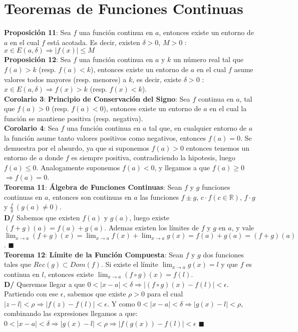 \documentclass[11pt,a4paper]{article}
\newcommand*{\QEDA}{\null\nobreak\hfill\ensuremath{\blacksquare}}
\begin{document}
\section{Teoremas de Funciones Continuas}
\textbf{Proposici\'on 11}: Sea $f$ una funci\'on continua en $a$, entonces existe un entorno de $a$ en el cual $f$ est\'a acotada. Es decir, existen $\delta > 0$, $M > 0$ : $x \in E(a, \delta) \Rightarrow |f(x)| \leq M$\\

\noindent \textbf{Proposici\'on 12}: Sea $f$ una funci\'on continua en $a$ y $k$ un n\'umero real tal que $f(a) > k$ (resp. $f(a) < k$), entonces existe un entorno de $a$ en el cual $f$ asume valores todos mayores (resp. menores) a $k$, es decir, existe $\delta > 0$ : $x \in E(a,\delta) \Rightarrow f(x) > k$ (resp. $f(x) < k$).\\

\noindent \textbf{Corolario 3}: \textbf{Principio de Conservaci\'on del Signo}: Sea $f$ continua en $a$, tal que $f(a)>0$ (resp. $f(a)<0$), entonces existe un entorno de $a$ en el cual la funci\'on se mantiene positiva (resp. negativa).\\

\noindent \textbf{Corolario 4}: Sea $f$ una funci\'on continua en $a$ tal que, en cualquier entorno de $a$ la funci\'on asume tanto valores positivos como negativos, entonces $f(a)=0$. Se demuestra por el absurdo, ya que si suponemos $f(a)>0$ entonces tenemos un entorno de $a$ donde $f$ es siempre positiva, contradiciendo la hipotesis, luego $f(a)\leq 0$. Analogamente suponemos $f(a)<0$, y llegamos a que $f(a)\geq 0$ $\Rightarrow f(a)=0$.\\

\noindent \textbf{Teorema 11}: \textbf{\'Algebra de Funciones Continuas}: Sean $f$ y $g$ funciones continuas en $a$, entonces son continuas en $a$ las funciones $f \pm g$, $c \cdot f (c \in \mathbb{R})$, $f \cdot g$ y $\frac{f}{g}\ (g(a) \not = 0)$.\\
\noindent \textbf{D/} Sabemos que existen $f(a)$ y $g(a)$, luego existe $(f+g)(a) = f(a) + g(a)$. Ademas existen los l\'imites de $f$ y $g$ en $a$, y vale $\displaystyle{\lim_{x \to a} (f+g)(x) = \lim_{x \to a} f(x) + \lim_{x \to a} g(x) = f(a) + g(a) = (f+g)(a)}$. \QEDA\\

\noindent \textbf{Teorema 12}: \textbf{L\'imite de la Funci\'on Compuesta}: Sean $f$ y $g$ dos funciones tales que $Rec(g) \subset Dom(f)$. Si existe el l\'imite $\displaystyle{\lim_{x \to a} g(x) = l}$ y que $f$ es continua en $l$, entonces existe $\displaystyle{\lim_{x \to a} (f\circ g)(x) = f(l)}$.\\
\textbf{D/} Queremos llegar a que $0<|x-a|<\delta \Rightarrow |(f \circ g)(x) - f(l)| < \epsilon$. Partiendo con ese $\epsilon$, sabemos que existe $\rho > 0$ para el cual $|z-l| < \rho \Rightarrow |f(z)-f(l)| < \epsilon$. Y como $0 < |x-a| < \delta \Rightarrow |g(x) - l| < \rho$, combinando las expresiones llegamos a que: \\ \indent \indent \indent \indent \indent \indent \indent $0 < |x-a| < \delta \Rightarrow |g(x)-l| < \rho \Rightarrow |f(g(x)) - f(l)| < \epsilon $ \QEDA\\
\end{document}
